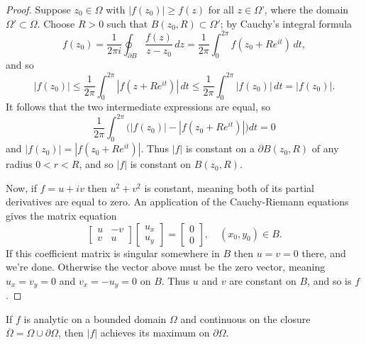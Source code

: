 \documentclass[../m136main.tex]{subfiles}
\begin{document}
\begin{proof}
    Suppose $z_0 \in \Omega$ with $|f(z_0)| \geq f(z)$ for all $z \in \Omega$', where the domain $\Omega' \subset \Omega$.
    Choose $R > 0$ such that $B(z_0, R) \subset \Omega'$; by Cauchy's integral formula
    \[ f(z_0) = \frac{1}{2\pi i} \oint_{\partial B} \frac{f(z)}{z - z_0} \,dz = \frac{1}{2\pi} \int_{0}^{2\pi} f(z_0 + Re^{it}) \,dt, \]
    and so
    \[ |f(z_0)| \leq \frac{1}{2\pi} \int_{0}^{2\pi} |f(z + Re^{it})| \,dt \leq \frac{1}{2\pi} \int_{0}^{2\pi} |f(z_0)| \,dt = |f(z_0)|. \]
    It follows that the two intermediate expressions are equal, so
    \[ \frac{1}{2\pi} \int_{0}^{2\pi} \Big( |f(z_0)| - |f(z_0 + Re^{it})| \Big) dt = 0 \]
    and $|f(z_0)| = |f(z_0 + Re^{it})|$.
    Thus $|f|$ is constant on a $\partial B(z_0, R)$ of any radius $0 < r < R$, and so $|f|$ is constant on $B(z_0, R)$.

    Now, if $f = u + iv$ then $u^2 + v^2$ is constant, meaning both of its partial derivatives are equal to zero.
    An application of the Cauchy-Riemann equations gives the matrix equation
    \[ \begin{bmatrix} u & -v \\ v & u \end{bmatrix} \begin{bmatrix} u_x \\ u_y \end{bmatrix} = \begin{bmatrix} 0 \\ 0 \end{bmatrix}, \quad (x_0, y_0) \in B. \]
    If this coefficient matrix is singular somewhere in $B$ then $u = v = 0$ there, and we're done.
    Otherwise the vector above must be the zero vector, meaning $u_x = v_y = 0$ and $v_x = -u_y = 0$ on $B$.
    Thus $u$ and $v$ are constant on $B$, and so is $f$.
\end{proof}

\begin{corollary}[]
    If $f$ is analytic on a bounded domain $\Omega$ and continuous on the closure $\overline \Omega = \Omega \cup \partial \Omega$, then $|f|$ achieves its maximum on $\partial \Omega$.
\end{corollary}
\end{document}
